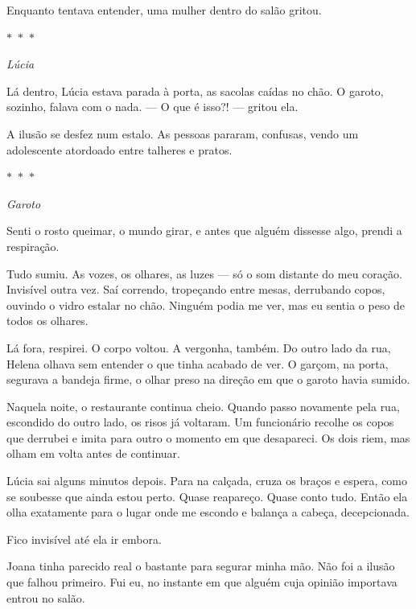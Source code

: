 Enquanto tentava entender, uma mulher dentro do salão gritou.

\medskip

\begin{center}
$\ast$~$\ast$~$\ast$

\textit{Lúcia}
\end{center}

Lá dentro, Lúcia estava parada à porta, as sacolas caídas no chão.  
O garoto, sozinho, falava com o nada.  
— O que é isso?! — gritou ela.

A ilusão se desfez num estalo.  
As pessoas pararam, confusas, vendo um adolescente atordoado entre talheres e pratos.  
\medskip

\begin{center}
$\ast$~$\ast$~$\ast$

\textit{Garoto}
\end{center}

Senti o rosto queimar, o mundo girar, e antes que alguém dissesse algo, prendi a respiração.

Tudo sumiu.  
As vozes, os olhares, as luzes — só o som distante do meu coração.  
Invisível outra vez.  
Saí correndo, tropeçando entre mesas, derrubando copos, ouvindo o vidro estalar no chão.  
Ninguém podia me ver, mas eu sentia o peso de todos os olhares.

Lá fora, respirei. O corpo voltou.  
A vergonha, também.  
Do outro lado da rua, Helena olhava sem entender o que tinha acabado de ver.  
O garçom, na porta, segurava a bandeja firme, o olhar preso na direção em que o garoto havia sumido.

\medskip

Naquela noite, o restaurante continua cheio. Quando passo novamente pela rua, escondido do outro lado, os risos já voltaram. Um funcionário recolhe os copos que derrubei e imita para outro o momento em que desapareci. Os dois riem, mas olham em volta antes de continuar.

Lúcia sai alguns minutos depois. Para na calçada, cruza os braços e espera, como se soubesse que ainda estou perto. Quase reapareço. Quase conto tudo. Então ela olha exatamente para o lugar onde me escondo e balança a cabeça, decepcionada.

Fico invisível até ela ir embora.

Joana tinha parecido real o bastante para segurar minha mão. Não foi a ilusão que falhou primeiro. Fui eu, no instante em que alguém cuja opinião importava entrou no salão.
